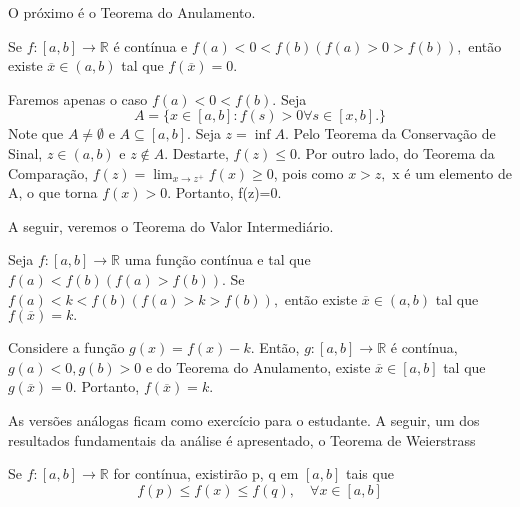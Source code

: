 \documentclass[Analysis/analysis_notes.tex]{subfiles}
\begin{document}
O pr\'oximo \'e o Teorema do Anulamento.
\begin{theorem*}
	Se $f:[a,b]\rightarrow \mathbb{R}$ \'e cont\'inua e $f(a)<0<f(b) (f(a)>0>f(b)),$ ent\~ao existe $\overline{x}\in(a, b)$ tal que $f(\overline{x}) =0.$
\end{theorem*}
\begin{proof*}
	Faremos apenas o caso $f(a)<0<f(b).$ Seja
	$$
		A = \{x\in[a,b]:f(s)>0 \forall s\in[x, b].\}
	$$
	Note que $A\neq\emptyset$ e $A\subseteq{[a, b]}.$ Seja $z =\inf{A}$. Pelo Teorema da Conserva\c c\~ao de Sinal,
	$z\in(a, b)$ e $z\not\in A.$ Destarte, $f(z)\leq{0}.$ Por outro lado, do Teorema da Compara\c c\~ao, $f(z)=
		\lim_{x\to z^{+}}f(x)\geq{0}$, pois como $x > z,$ x \'e um elemento de A, o que torna $f(x)>0$. Portanto, f(z)=0.
\end{proof*}
A seguir, veremos o Teorema do Valor Intermedi\'ario.
\begin{theorem*}
	Seja $f:[a, b]\rightarrow \mathbb{R}$ uma fun\c c\~ao cont\'inua e tal que  $f(a)<f(b)(f(a)>f(b))$. Se $f(a)<k<f(b)(f(a)>k>f(b)),$
	ent\~ao existe $\overline{x}\in(a, b)$ tal que $f(\overline{x})=k.$
\end{theorem*}
\begin{proof*}
	Considere a fun\c c\~ao $g(x)=f(x)-k.$ Ent\~ao, $g:[a, b]\rightarrow \mathbb{R}$ \'e cont\'inua, $g(a)<0, g(b)>0$
	e do Teorema do Anulamento, existe $\overline{x}\in[a, b]$ tal que $g(\overline{x})=0.$ Portanto, $f(\overline{x})=k.$\qedsymbol
\end{proof*}
As vers\~oes an\'alogas ficam como exerc\'icio para o estudante.
A seguir, um dos resultados fundamentais da an\'alise \'e apresentado, o Teorema de Weierstrass
\begin{theorem*}
	Se $f:[a, b]\rightarrow \mathbb{R}$ for cont\'inua, existir\~ao p, q em $[a, b]$ tais que
	$$
		f(p)\leq f(x)\leq f(q),\quad \forall x\in[a,b]
	$$
\end{theorem*}
\end{document}
